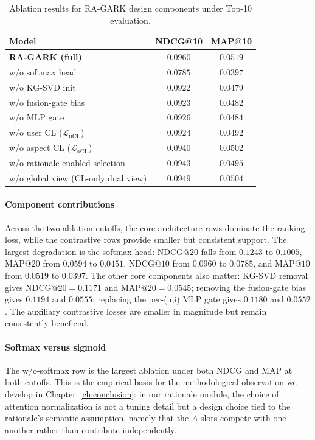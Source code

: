\begin{table}[H]
\centering
\caption{Ablation results for RA-GARK design components under Top-10 evaluation.}
\label{tab:ablation@10}
\begin{tabular}{lcc}
\toprule
Model & NDCG@10 & MAP@10 \\
\midrule
\textbf{RA-GARK (full)}              & $\mathbf{0.0960}$ & $\mathbf{0.0519}$ \\
\midrule
w/o softmax head             & $0.0785$ & $0.0397$ \\
w/o KG-SVD init              & $0.0922$ & $0.0479$ \\
w/o fusion-gate bias         & $0.0923$ & $0.0482$ \\
w/o MLP gate                 & $0.0926$ & $0.0484$ \\
\midrule
w/o user CL ($\mathcal{L}_{\mathrm{uCL}}$)  & $0.0924$ & $0.0492$ \\
w/o aspect CL ($\mathcal{L}_{\mathrm{aCL}}$) & $0.0940$ & $0.0502$ \\
\midrule
w/o rationale-enabled selection & $0.0943$ & $0.0495$ \\
w/o global view (CL-only dual view)  & $0.0949$ & $0.0504$ \\
\bottomrule
\end{tabular}
\end{table}
\FloatBarrier

\paragraph{Component contributions} Across the two ablation cutoffs, the core architecture rows dominate the ranking loss, while the contrastive rows provide smaller but consistent support. The largest degradation is the softmax head: NDCG@$20$ falls from $0.1243$ to $0.1005$, MAP@$20$ from $0.0594$ to $0.0451$, NDCG@$10$ from $0.0960$ to $0.0785$, and MAP@$10$ from $0.0519$ to $0.0397$. The other core components also matter: KG-SVD removal gives NDCG@$20 = 0.1171$ and MAP@$20 = 0.0545$; removing the fusion-gate bias gives $0.1194$ and $0.0555$; replacing the per-(u,i) MLP gate gives $0.1180$ and $0.0552$. The auxiliary contrastive losses are smaller in magnitude but remain consistently beneficial.

\paragraph{Softmax versus sigmoid} The w/o-softmax row is the largest ablation under both NDCG and MAP at both cutoffs. This is the empirical basis for the methodological observation we develop in Chapter~\ref{ch:conclusion}: in our rationale module, the choice of attention normalization is not a tuning detail but a design choice tied to the rationale's semantic assumption, namely that the $A$ slots compete with one another rather than contribute independently.

